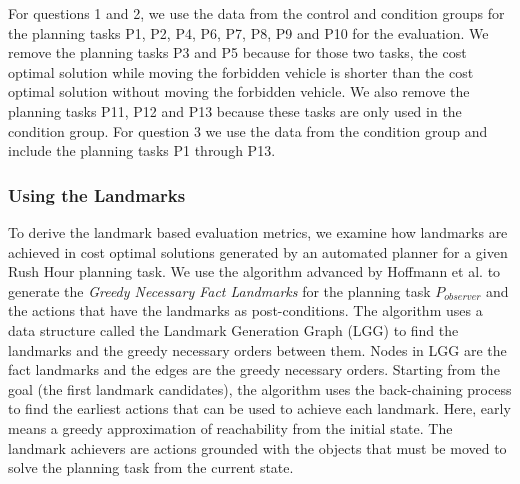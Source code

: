 For questions 1 and 2, we use the data from the control and condition groups for the planning tasks P1, P2, P4, P6, P7, P8, P9 and P10 for the evaluation.
We remove the planning tasks P3 and P5 because for those two tasks, the cost optimal solution while moving the forbidden vehicle is shorter than the cost optimal solution without moving the forbidden vehicle.
We also remove the planning tasks P11, P12 and P13 because these tasks are only used in the condition group.
For question 3 we use the data from the condition group and include the planning tasks P1 through P13.

\subsubsection{Using the Landmarks}
\label{sec:usingthelandmarks}
To derive the landmark based evaluation metrics, we examine how landmarks are achieved in cost optimal solutions generated by an automated planner for a given Rush Hour planning task.
We use the algorithm advanced by Hoffmann et al. \citeyear{hoffman2004lm} to generate the \textit{Greedy Necessary Fact Landmarks} for the planning task $P_{observer}$ and the actions that have the landmarks as post-conditions.
The algorithm uses a data structure called the Landmark Generation Graph (LGG) to find the landmarks and the greedy necessary orders between them. 
Nodes in LGG are the fact landmarks and the edges are the greedy necessary orders. 
Starting from the goal (the first landmark candidates), the algorithm uses the back-chaining process to find the earliest actions that can be used to achieve each landmark. 
Here, early means a greedy approximation of reachability from the initial state. 
The landmark achievers are actions grounded with the objects that must be moved to solve the planning task from the current state.

